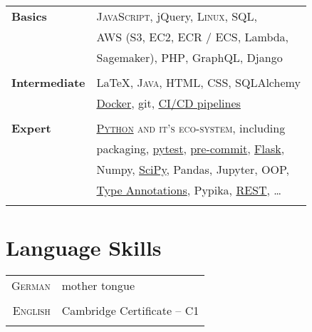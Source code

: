 \documentclass[a4paper,10pt]{article} %
\begin{document}
{\begin{minipage}[t]{0.44\textwidth}
\begin{tabular}{ll}
\textbf{Basics}& \textsc{JavaScript}, jQuery, \textsc{Linux}, \textsc{SQL}, \\
               & AWS (S3, EC2, ECR / ECS, Lambda, \\
               & Sagemaker), \textsc{PHP}, GraphQL, Django\\ \\
\textbf{Intermediate} & \LaTeX, \textsc{Java}, \textsc{HTML}, \textsc{CSS}, SQLAlchemy\\
               & \href{https://martin-thoma.com/docker/}{Docker}, git, \href{https://levelup.gitconnected.com/ci-pipelines-for-python-projects-9ac2830d2e38}{CI/CD pipelines}\\ \\
\textbf{Expert} & \textsc{\href{https://stackoverflow.com/help/badges/51/python?userid=562769}{Python} and it's eco-system}, including\\
               & packaging, \href{https://medium.com/swlh/unit-testing-in-python-basics-21a9a57418a0}{pytest}, \href{https://towardsdatascience.com/pre-commit-hooks-you-must-know-ff247f5feb7e}{pre-commit}, \href{https://medium.com/analytics-vidhya/how-to-test-flask-applications-aef12ae5181c}{Flask},\\
               & Numpy, \href{https://arxiv.org/pdf/1907.10121.pdf}{SciPy}, Pandas, Jupyter, OOP, \\
               & \href{https://medium.com/analytics-vidhya/type-annotations-in-python-3-8-3b401384403d}{Type Annotations}, Pypika, \href{https://martin-thoma.com/rest/}{REST}, \dots\\ \\
\end{tabular}


\section{Language Skills}

\begin{tabular}{rl}
\textsc{German}
& mother tongue\\
& \\
\textsc{English}
& Cambridge Certificate – C1\\
& \\
\end{tabular}\\[10pt]


\end{minipage}}
\end{document}
